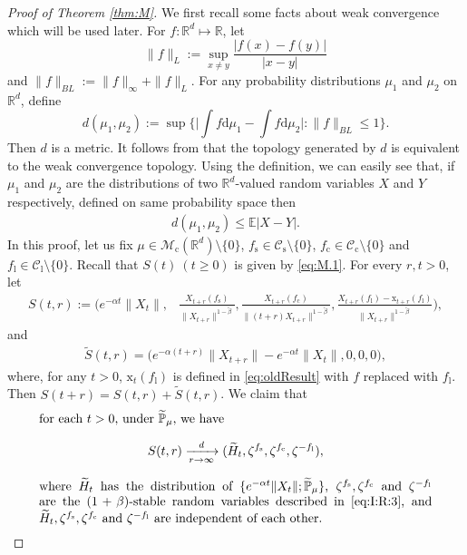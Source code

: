 \documentclass[12pt,a4paper]{amsart}
\theoremstyle{plain}
\theoremstyle{definition}
\numberwithin{equation}{section}
\begin{document}
\begin{proof}[Proof of Theorem \ref{thm:M}]
 We first recall some facts about weak convergence which will be used later. For $f:\mathbb R^d\mapsto \mathbb R$, let
 $$
 \|f\|_L:=\sup_{x\neq y}\frac{|f(x)-f(y)|}{|x-y|}
 $$
 and $\|f\|_{BL}:= \|f\|_{\infty}+\|f\|_L. $
 For any probability distributions $\mu_1$ and $\mu_2$ on $\mathbb R^d$, define
\[
  d(\mu_1,\mu_2)
  :=\sup\Big\{\Big|\int f \mathrm d\mu_1-\int f \mathrm d\mu_2\Big|:\|f\|_{BL}\leq 1\Big\}.
\]
Then $d$ is a metric. It follows from \cite[Theorem 11.3.3]{Dudley2002} that the topology generated by $d$ is equivalent to the weak convergence topology.
Using the definition, we can easily see that, if $\mu_1$ and $\mu_2$ are the distributions of two $\mathbb R^d $-valued random variables $X$ and $Y$ respectively,
defined on same probability space then
\begin{align}\label{ineq: distribution control}
  d(\mu_1,\mu_2) \leq \mathbb E|X-Y|.
\end{align}
In this proof, let us fix $\mu\in \mathcal M_\mathrm c(\mathbb R^d)\setminus \{0\}$, $f_\mathrm s\in \mathcal C_\mathrm s\setminus\{0\}$, $f_\mathrm c \in \mathcal C_\mathrm c\setminus\{0\}$ and $f_\mathrm l \in \mathcal C_\mathrm l\setminus\{0\}$.
Recall that $S(t)~(t\geq 0)$ is given by \eqref{eq:M.1}.
For every $r,t> 0$, let
\begin{align}
 S(t,r):=\Big(e^{-\alpha t}\|X_t\|,& \frac{X_{t+r}(f_\mathrm s)}{\|X_{t+r}\|^{1-\tilde{\beta}}}, \frac{X_{t+r}(f_\mathrm c)}{\|(t+r)X_{t+r}\|^{1-\tilde{\beta}}}, \frac{X_{t+r}(f_\mathrm l)-\mathrm x_{t+r}(f_\mathrm l) }{\|X_{t+r}\|^{1-\tilde{\beta}}}\Big),
\end{align}
and
\begin{align}
\widetilde{S}(t,r)= \Big(e^{-\alpha (t+r)}\|X_{t+r}\|-e^{-\alpha t}\|X_t\|,0,0,0\Big),
\end{align}
where, for any $t>0$, $\mathrm x_t(f_\mathrm l)$ is defined in \eqref{eq:oldResult} with $f$ replaced with $f_\mathrm l$.
Then $S(t+r)=S(t,r)+\widetilde{S}(t,r)$.
We claim that
\begin{equation}\label{eq:M.3}
\begin{minipage}{0.9\textwidth}
	for each $t> 0$, under $\widetilde{\mathbb P}_{\mu}$, we have
	\[
	S(t,r)\xrightarrow[r\rightarrow \infty]{d} (\widetilde H_t,\zeta^{f_\mathrm s},\zeta^{f_\mathrm c},\zeta^{-f_\mathrm l}),
	\]
	where $\widetilde H_t$ has the distribution of $\{e^{-\alpha t} \|X_t\|; \widetilde {\mathbb P}_\mu\}$,
	$\zeta^{f_\mathrm s},\zeta^{f_\mathrm c}$ and $\zeta^{-f_\mathrm l}$ are the $(1+\beta)$-stable random variables described in \eqref{eq:I:R:3}, 
	and $\widetilde H_t,\zeta^{f_\mathrm s},\zeta^{f_\mathrm c}$ and $\zeta^{-f_\mathrm l}$ are independent of each other.
\end{minipage}
\end{equation}


\end{proof}
\end{document}
